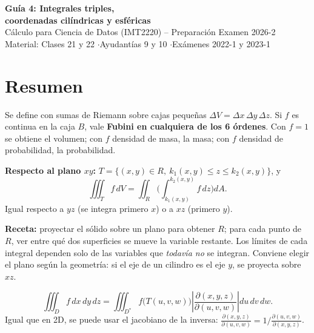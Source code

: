 \documentclass[11pt,a4paper]{article}
\newcommand{\R}{\mathbb{R}}
\newcommand{\dV}{\,dV}
\begin{document}
\begin{center}
{\LARGE\bfseries Guía 4: Integrales triples,\\[2pt] coordenadas cilíndricas y esféricas}\\[6pt]
{\large Cálculo para Ciencia de Datos (IMT2220) -- Preparación Examen 2026-2}\\[3pt]
{\small Material: Clases 21 y 22 \quad$\cdot$\quad Ayudantías 9 y 10 \quad$\cdot$\quad Exámenes 2022-1 y 2023-1}
\end{center}

\section{Resumen}

\begin{resumen}
Se define con sumas de Riemann sobre cajas pequeñas $\Delta V=\Delta x\,\Delta y\,\Delta z$. Si $f$ es continua en la caja $B$, vale \textbf{Fubini en cualquiera de los 6 órdenes}. Con $f=1$ se obtiene el volumen; con $f$ densidad de masa, la masa; con $f$ densidad de probabilidad, la probabilidad.
\end{resumen}

\begin{resumen}
\textbf{Respecto al plano $xy$:} $T=\{(x,y)\in R,\ k_1(x,y)\le z\le k_2(x,y)\}$, y
\[
\iiint_T f\dV=\iint_R\Big(\int_{k_1(x,y)}^{k_2(x,y)}f\,dz\Big)dA .
\]
Igual respecto a $yz$ (se integra primero $x$) o a $xz$ (primero $y$).

\textbf{Receta:} proyectar el sólido sobre un plano para obtener $R$; para cada punto de $R$, ver entre qué dos superficies se mueve la variable restante. Los límites de cada integral dependen solo de las variables que \emph{todavía no} se integran.
Conviene elegir el plano según la geometría: si el eje de un cilindro es el eje $y$, se proyecta sobre $xz$.
\end{resumen}

\begin{resumen}[Cambio de variables en $\R^3$]
\[
\iiint_D f\,dx\,dy\,dz=\iiint_{D^*}f\big(T(u,v,w)\big)\left|\frac{\partial(x,y,z)}{\partial(u,v,w)}\right|du\,dv\,dw .
\]
Igual que en 2D, se puede usar el jacobiano de la inversa: $\frac{\partial(x,y,z)}{\partial(u,v,w)}=1\big/\frac{\partial(u,v,w)}{\partial(x,y,z)}$.
\end{resumen}
\end{document}
